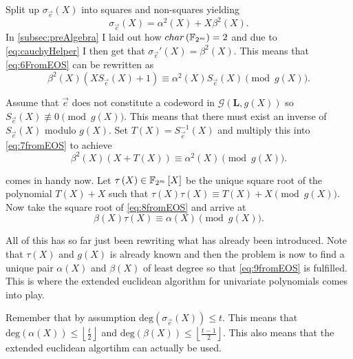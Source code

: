 Split up $\sigma_{\vec{e}}\left(X\right)$ into squares and non-squares yielding
\begin{equation}
\label{eq:splitSigma}
\sigma_{\vec{e}}\left(X\right) = \alpha^2\left(X\right) + X \beta^2\left(X\right).
\end{equation}
In \cref{subsec:preAlgebra} I laid out how $char\left(\mathbb{F}_{2^m}\right) = 2$ and due to \cref{eq:cauchyHelper} I then get that $\sigma_{\vec{e}}'\left(X\right) = \beta^2\left(X\right)$. This means that \cref{eq:6FromEOS} can be rewritten as
\begin{equation}
\label{eq:7fromEOS}
\beta^2\left(X\right) \left(X S_{\vec{e}}\left(X\right) + 1\right) \equiv \alpha^2\left(X\right) S_{\vec{e}}\left(X\right) \pmod {g\left(X\right)}.
\end{equation}

Assume that $\vec{e}$ does not constitute a codeword in $\mathcal{G}\left(\mathbf{L}, g\left(X\right)\right)$ so\\
$S_{\vec{e}}\left(X\right) \nequiv 0 \pmod {g\left(X\right)}$. This means that there must exist an inverse of $S_{\vec{e}}\left(X\right)$ modulo $g\left(X\right)$. Set $T\left(X\right) = S_{\vec{e}}^{-1}\left(X\right)$ and multiply this into \cref{eq:7fromEOS} to achieve
\begin{equation}
\label{eq:8fromEOS}
\beta^2\left(X\right) \left(X + T\left(X\right)\right) \equiv \alpha^2\left(X\right) \pmod {g\left(X\right)}.
\end{equation}

 comes in handy now. Let $\tau\left(X\right) \in \mathbb{F}_{2^m}\left[X\right]$ be the unique square root of the polynomial $T\left(X\right) + X$ such that $\tau\left(X\right) \tau\left(X\right) \equiv T\left(X\right) + X \pmod {g\left(X\right)}$. Now take the square root of \cref{eq:8fromEOS} and arrive at
\begin{equation}
\label{eq:9fromEOS}
\beta\left(X\right) \tau\left(X\right) \equiv \alpha\left(X\right) \pmod {g\left(X\right)}.
\end{equation}

All of this has so far just been rewriting what has already been introduced. Note that $\tau\left(X\right)$ and $g\left(X\right)$ is already known and then the problem is now to find a unique pair $\alpha\left(X\right)$ and $\beta\left(X\right)$ of least degree so that \cref{eq:9fromEOS} is fulfilled. This is where the extended euclidean algorithm for univariate polynomials comes into play.

Remember that by assumption $\mathrm{deg}\left(\sigma_{\vec{e}}\left(X\right)\right) \leq t.$ This means that $\mathrm{deg}\left(\alpha\left(X\right)\right) \leq \left\lfloor \frac{t}{2} \right\rfloor$ and $\mathrm{deg}\left(\beta\left(X\right)\right) \leq \left\lfloor \frac{t-1}{2} \right\rfloor$. This also means that the extended euclidean algortihm can actually be used.

